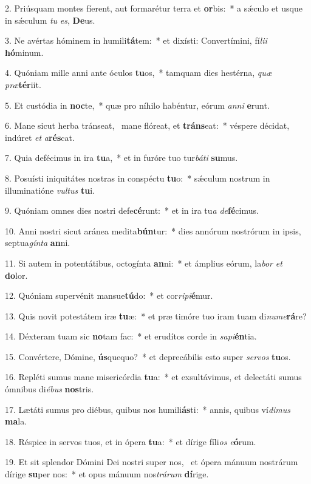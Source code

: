 2. Priúsquam montes fíerent, aut formarétur terra et \textbf{or}bis:~*  a sǽculo et usque in sǽculum \textit{tu} \textit{es}, \textbf{De}us.\

3. Ne avértas hóminem in humili\textbf{tá}tem:~*  et dixísti: Convertímini, fí\textit{li}\textit{i} \textbf{hó}minum.\

4. Quóniam mille anni ante óculos \textbf{tu}os,~*  tamquam dies hestérna, \textit{quæ} \textit{præ}\textbf{tér}iit.\

5. Et custódia in \textbf{noc}te,~*  quæ pro níhilo habéntur, eórum \textit{an}\textit{ni} \textbf{e}runt.\

6. Mane sicut herba tránseat, \dag\  mane flóreat, et \textbf{tráns}eat:~*  véspere décidat, indúret \textit{et} \textit{a}\textbf{rés}cat.\

7. Quia defécimus in ira \textbf{tu}a,~*  et in furóre tuo tur\textit{bá}\textit{ti} \textbf{su}mus.\

8. Posuísti iniquitátes nostras in conspéctu \textbf{tu}o:~*  sǽculum nostrum in illuminatióne \textit{vul}\textit{tus} \textbf{tu}i.\

9. Quóniam omnes dies nostri defe\textbf{cé}runt:~*  et in ira tu\textit{a} \textit{de}\textbf{fé}cimus.\

10. Anni nostri sicut aránea medita\textbf{bún}tur:~*  dies annórum nostrórum in ipsis, septua\textit{gín}\textit{ta} \textbf{an}ni.\

11. Si autem in potentátibus, octogínta \textbf{an}ni:~*  et ámplius eórum, la\textit{bor} \textit{et} \textbf{do}lor.\

12. Quóniam supervénit mansue\textbf{tú}do:~*  et cor\textit{ri}\textit{pi}\textbf{é}mur.\

13. Quis novit potestátem iræ \textbf{tu}æ:~*  et præ timóre tuo iram tuam di\textit{nu}\textit{me}\textbf{rá}re?\

14. Déxteram tuam sic \textbf{no}tam fac:~*  et erudítos corde in \textit{sa}\textit{pi}\textbf{én}tia.\

15. Convértere, Dómine, \textbf{ús}quequo?~*  et deprecábilis esto super \textit{ser}\textit{vos} \textbf{tu}os.\

16. Repléti sumus mane misericórdia \textbf{tu}a:~*  et exsultávimus, et delectáti sumus ómnibus di\textit{é}\textit{bus} \textbf{nos}tris.\

17. Lætáti sumus pro diébus, quibus nos humili\textbf{ás}ti:~*  annis, quibus ví\textit{di}\textit{mus} \textbf{ma}la.\

18. Réspice in servos tuos, et in ópera \textbf{tu}a:~*  et dírige fíli\textit{os} \textit{e}\textbf{ó}rum.\

19. Et sit splendor Dómini Dei nostri super nos, \dag\  et ópera mánuum nostrárum dírige \textbf{su}per nos:~*  et opus mánuum nos\textit{trá}\textit{rum} \textbf{dí}rige.\

